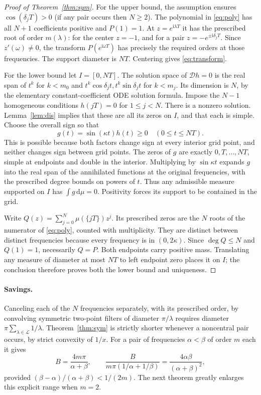 \documentclass[11pt]{article}
\theoremstyle{remark}\newtheorem{remark}[theorem]{Remark}
\newcommand{\dd}{\,\mathrm d}
\newcommand{\ii}{\mathrm i}
\begin{document}
\begin{proof}[Proof of Theorem~\ref{thm:sym}]
For the upper bound, the assumption ensures $\cos(\delta_j T)>0$ (if any pair occurs then $N\ge2$). The polynomial in \eqref{eq:poly} has all $N+1$ coefficients positive and $P(1)=1$. At $z=e^{\ii\lambda T}$ it has the prescribed root of order $m(\lambda)$: for the center $z=-1$, and for a pair $z=-e^{\pm\ii\delta_j T}$. Since $z'(\omega)\ne0$, the transform $P(e^{\ii\omega T})$ has precisely the required orders at those frequencies. The support diameter is $NT$. Centering gives \eqref{eq:transform}.

For the lower bound let $I=[0,NT]$. The solution space of $\mathcal D h=0$ is the real span of $t^k$ for $k<m_0$ and $t^k\cos\delta_jt,t^k\sin\delta_jt$ for $k<m_j$. Its dimension is $N$, by the elementary constant-coefficient ODE solution formula. Impose the $N-1$ homogeneous conditions $h(jT)=0$ for $1\le j<N$. There is a nonzero solution. Lemma~\ref{lem:dis} implies that these are all its zeros on $I$, and that each is simple. Choose the overall sign so that
\begin{equation}\label{eq:dual}
 g(t)=\sin(\kappa t)h(t)\ge0\quad(0\le t\le NT).
\end{equation}
This is possible because both factors change sign at every interior grid point, and neither changes sign between grid points. The zeros of $g$ are exactly $0,T,\dots,NT$, simple at endpoints and double in the interior. Multiplying by $\sin\kappa t$ expands $g$ into the real span of the annihilated functions at the original frequencies, with the prescribed degree bounds on powers of $t$. Thus any admissible measure supported on $I$ has $\int g\dd\mu=0$. Positivity forces its support to be contained in the grid.

Write $Q(z)=\sum_{j=0}^N \mu(\{jT\})z^j$. Its prescribed zeros are the $N$ roots of the numerator of \eqref{eq:poly}, counted with multiplicity. They are distinct between distinct frequencies because every frequency is in $(0,2\kappa)$. Since $\deg Q\le N$ and $Q(1)=1$, necessarily $Q=P$. Both endpoints carry positive mass. Translating any measure of diameter at most $NT$ to left endpoint zero places it on $I$; the conclusion therefore proves both the lower bound and uniqueness.\end{proof}

\paragraph{Savings.} Canceling each of the $N$ frequencies separately, with its prescribed order, by convolving symmetric two-point filters of diameter $\pi/\lambda$ requires diameter $\pi\sum_{\lambda\in\mathcal L}1/\lambda$. Theorem~\ref{thm:sym} is strictly shorter whenever a noncentral pair occurs, by strict convexity of $1/x$. For a pair of frequencies $\alpha<\beta$ of order $m$ each it gives
\[
 B=\frac{4m\pi}{\alpha+\beta},\qquad
 \frac{B}{m\pi(1/\alpha+1/\beta)}=\frac{4\alpha\beta}{(\alpha+\beta)^2},
\]
provided $(\beta-\alpha)/(\alpha+\beta)<1/(2m)$. The next theorem greatly enlarges this explicit range when $m=2$.
\end{document}
